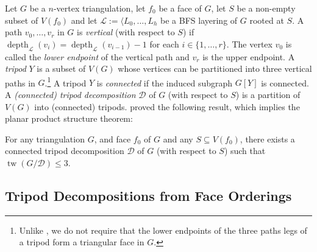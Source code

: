 \documentclass{patmorin}
\DeclareMathOperator{\tw}{tw}
\DeclareMathOperator{\depth}{depth}
\begin{document}
Let $G$ be a $n$-vertex triangulation, let $f_0$ be a face of $G$, let $S$ be a non-empty subset of $V(f_0)$ and let $\mathcal{L}:=\langle L_0,\ldots,L_h$ be a BFS layering of $G$ rooted at $S$.  A path $v_0,\ldots,v_r$ in $G$ is \emph{vertical} (with respect to $S$) if $\depth_\mathcal{L}(v_i)=\depth_{\mathcal{L}}(v_{i-1})-1$ for each $i\in\{1,\ldots,r\}$. The vertex $v_0$ is called the \emph{lower endpoint} of the vertical path and $v_r$ is the upper endpoint. A \emph{tripod} $Y$ is a subset of $V(G)$ whose vertices can be partitioned into three vertical paths in $G$.\footnote{Unlike \cite{dujmovic.joret.ea:planar}, we do not require that the lower endpoints of the three paths legs of a tripod form a triangular face in $G$.}
A tripod $Y$ is \emph{connected} if the induced subgraph $G[Y]$ is connected.  A \emph{(connected) tripod decomposition} $\mathcal{D}$ of $G$ (with respect to $S$) is a partition of $V(G)$ into (connected) tripods.  \citet{dujmovic.joret.ea:planar} proved the following result, which implies the planar product structure theorem:

\begin{thm}\label{tripod_decomposition}
  For any triangulation $G$, and face $f_0$ of $G$ and any $S\subseteq V(f_0)$, there exists a connected tripod decomposition $\mathcal{D}$ of $G$ (with respect to $S$) such that $\tw(G/\mathcal{D})\le 3$.
\end{thm}


\subsection{Tripod Decompositions from Face Orderings}
\end{document}
